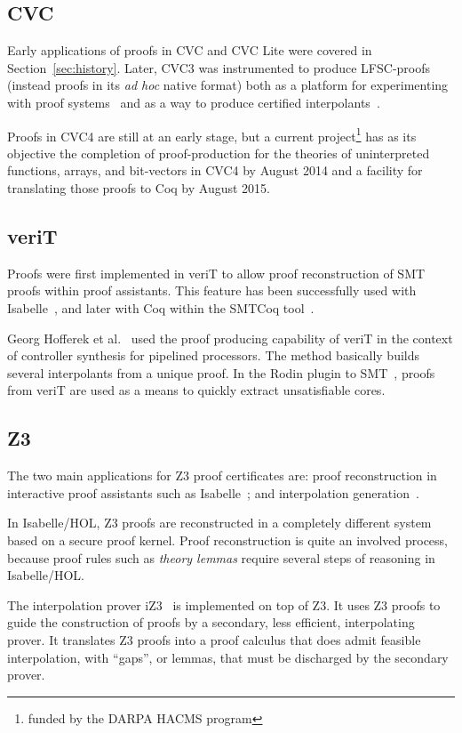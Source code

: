 \documentclass{llncs}
\begin{document}
\subsection{CVC}

Early applications of proofs in CVC and CVC Lite were covered in
Section~\ref{sec:history}.  Later, CVC3 was instrumented to produce LFSC-proofs
(instead proofs in its \emph{ad hoc} native format) both as a platform for
experimenting with proof systems~\cite{RHT+10} and as a way to produce certified
interpolants~\cite{RTH11}.

Proofs in CVC4 are still at an early stage, but a current
project\footnote{funded by the DARPA HACMS program} has as its objective the
completion of proof-production for the theories of uninterpreted functions,
arrays, and bit-vectors in CVC4 by August 2014 and a facility for translating
those proofs to Coq by August 2015.

\subsection{veriT}

Proofs were first implemented in veriT to allow proof reconstruction of SMT
proofs within proof assistants.  This feature has been successfully used with
Isabelle~\cite{FMM+06}, and later with Coq within the SMTCoq
tool~\cite{AFGKTW11b,keller13}.

Georg Hofferek et al.~\cite{Hofferek1} used the proof producing capability of
veriT in the context of controller synthesis for pipelined processors.  The
method basically builds several interpolants from a unique proof.  In the Rodin
plugin to SMT~\cite{Deharbe1}, proofs from veriT are used as a means to quickly
extract unsatisfiable cores.

\subsection{Z3}

The two main applications for Z3 proof certificates are: proof
reconstruction in interactive proof assistants such as
Isabelle~\cite{IsabelleZ3}; and interpolation generation~\cite{iZ3}.

In Isabelle/HOL, Z3 proofs are reconstructed in a completely different
system based on a secure proof kernel. Proof reconstruction is quite an
involved process, because proof rules such as \emph{theory lemmas} require
several steps of reasoning in Isabelle/HOL.

The interpolation prover iZ3~\cite{iZ3} is implemented on top of Z3.  It uses Z3
proofs to guide the construction of proofs by a secondary, less
efficient, interpolating prover. It translates Z3 proofs into
a proof calculus that does admit feasible interpolation, with
``gaps'', or lemmas, that must be discharged by the secondary prover.
\end{document}
